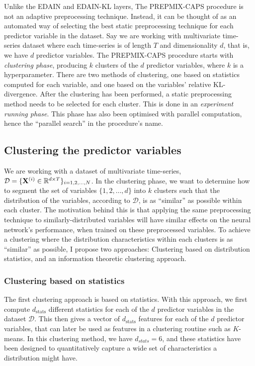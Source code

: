 \documentclass{statsmsc}
\begin{document}
{Unlike the \ac{EDAIN} and \ac{EDAIN-KL} layers, The \ac{PREPMIX-CAPS} procedure
is not an adaptive preprocessing technique. Instead, it can be thought of as an automated way
of selecting the best static preprocessing technique for each predictor variable in the dataset.
Say we are working with multivariate time-series dataset where each time-series is of length $T$
and dimensionality $d$, that is, we have $d$ predictor variables.
The \ac{PREPMIX-CAPS} procedure starts with \textit{clustering phase},
producing $k$ clusters of the $d$ predictor variables,
where $k$ is a hyperparameter. There are two methods of clustering, one based on statistics
computed for each variable, and one based on the variables' relative \ac{KL-divergence}.
After the clustering has been performed, a static preprocessing method needs to be selected
for each cluster. This is done in an \textit{experiment running phase}. This phase has also
been  optimised with parallel computation, hence the ``parallel search'' in the procedure's
name.

\subsection{Clustering the predictor variables}%
\label{sub:prepmix-clustering}

We are working with a dataset of multivariate time-series,
$\mathcal{D}=\{\mathbf{X}^{(i)} \in \mathbb{R}^{d \times T}\}_{i=1,2,\dots,N}$.  In the
clustering phase, we want to determine how to segment the set of variables
$\{1,2,\dots,d\}$ into $k$ clusters such that the distribution of the
variables, according to $\mathcal{D}$, is as ``similar'' as possible within
each cluster.  The motivation behind this is that applying the same
preprocessing technique to similarly-distributed variables will have similar
effects on the neural network's performance, when trained on these preprocessed
variables.  To achieve a clustering where the distribution characteristics
within each clusters is as ``similar'' as possible, I propose two approaches:
Clustering based on distribution statistics, and an information theoretic clustering approach.

\subsubsection{Clustering based on statistics}%
\label{sub:Clustering based on statistics}

The first clustering approach is based on statistics. With this approach, we first compute
$d_{\textrm{stats}}$ different statistics for each of the $d$ predictor variables in the dataset $\mathcal{D}$.
This then gives a vector of $d_{\textrm{stats}}$ features for each of the $d$ predictor variables,
that can later be used as features in a clustering routine such as $K$-means. In this clustering
method, we have $d_{stats}=6$, and these statistics have been designed to quantitatively
capture a wide set of characteristics a distribution might have.

}
\end{document}
